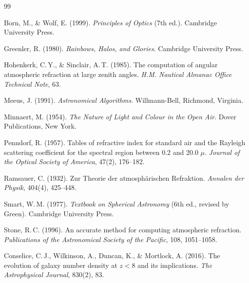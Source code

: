 ﻿\documentclass[12pt,a4paper]{article}
\begin{document}

\begin{thebibliography}{99}

Born, M., \& Wolf, E. (1999).
\newblock \textit{Principles of Optics} (7th ed.).
\newblock Cambridge University Press.
\newblock {}

Greenler, R. (1980).
\newblock \textit{Rainbows, Halos, and Glories}.
\newblock Cambridge University Press.

Hohenkerk, C.\,Y., \& Sinclair, A.\,T. (1985).
\newblock The computation of angular atmospheric refraction at large
  zenith angles.
\newblock \textit{H.M. Nautical Almanac Office Technical Note}, 63.

Meeus, J. (1991).
\newblock \textit{Astronomical Algorithms}.
\newblock Willmann-Bell, Richmond, Virginia.

Minnaert, M. (1954).
\newblock \textit{The Nature of Light and Colour in the Open Air}.
\newblock Dover Publications, New York.

Penndorf, R. (1957).
\newblock Tables of refractive index for standard air and the Rayleigh
  scattering coefficient for the spectral region between 0.2 and 20.0 $\mu$.
\newblock \textit{Journal of the Optical Society of America}, 47(2), 176--182.
\newblock {}

Ramsauer, C. (1932).
\newblock Zur Theorie der atmosphärischen Refraktion.
\newblock \textit{Annalen der Physik}, 404(4), 425--448.

Smart, W.\,M. (1977).
\newblock \textit{Textbook on Spherical Astronomy} (6th ed., revised by Green).
\newblock Cambridge University Press.

Stone, R.\,C. (1996).
\newblock An accurate method for computing atmospheric refraction.
\newblock \textit{Publications of the Astronomical Society of the Pacific},
  108, 1051--1058.
\newblock {}

Conselice, C.\,J., Wilkinson, A., Duncan, K., \& Mortlock, A. (2016).
\newblock The evolution of galaxy number density at $z < 8$ and its
  implications.
\newblock \textit{The Astrophysical Journal}, 830(2), 83.
\newblock {}


\end{thebibliography}
\end{document}

